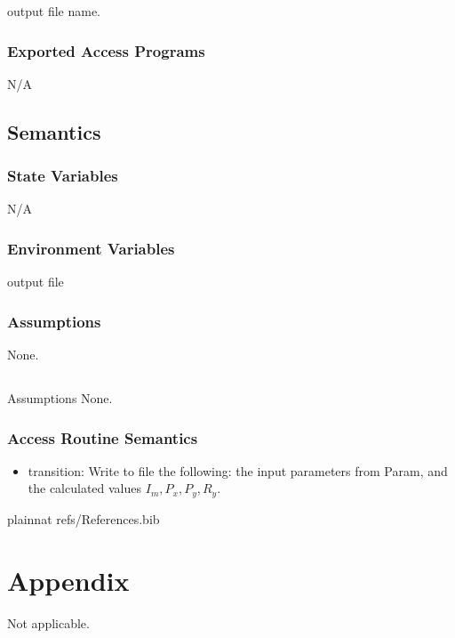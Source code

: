 \documentclass[12pt, titlepage]{article}
\begin{document}
output file name.
\subsubsection{Exported Access Programs}
N/A
\subsection{Semantics}
\subsubsection{State Variables}
N/A

\subsubsection{Environment Variables}
output file

\subsubsection{Assumptions}
None.

\subsection{}{Assumptions}
None.
\subsubsection{Access Routine Semantics}
\begin{itemize}
    \item transition: Write to file the following: the input 
parameters from Param, and the calculated values $I_m, P_x,P_y,R_y$. 

\end{itemize}


\newpage

 {plainnat}
 {refs/References.bib}

\newpage

\section{Appendix} \label{Appendix}

Not applicable.
\end{document}
